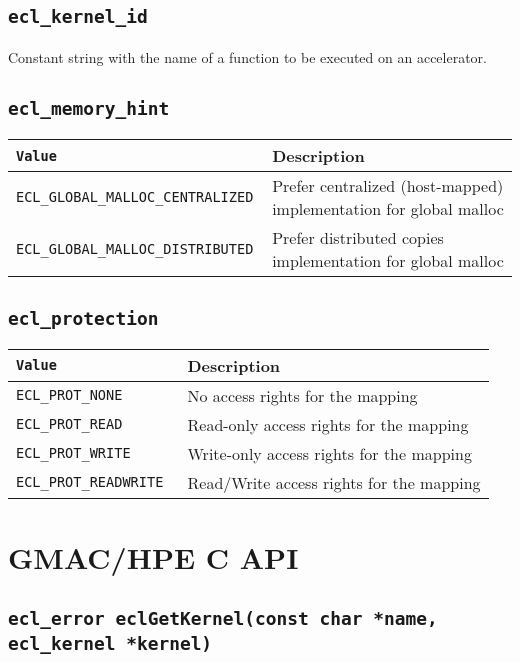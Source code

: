 \subsection{\texttt{ecl\_kernel\_id}}

Constant string with the name of a function to be executed on an accelerator.

\subsection{\texttt{ecl\_memory\_hint}}
\begin{tabularx}{\linewidth}{|>{\texttt\bgroup}l<{\egroup}|X|}
  \hline
  \textnormal{Value} & Description \\
  \hline
  \hline
  ECL\_GLOBAL\_MALLOC\_CENTRALIZED & Prefer centralized (host\hyp{}mapped) implementation for global 
  malloc \\
  ECL\_GLOBAL\_MALLOC\_DISTRIBUTED & Prefer distributed copies implementation for global malloc \\
  \hline
\end{tabularx}


\subsection{\texttt{ecl\_protection}}
\begin{tabularx}{\linewidth}{|>{\texttt\bgroup}l<{\egroup}|X|}
  \hline
  \textnormal{Value} & Description \\
  \hline
  \hline
  ECL\_PROT\_NONE  & No access rights for the mapping \\
  ECL\_PROT\_READ  & Read\hyp{}only access rights for the mapping \\
  ECL\_PROT\_WRITE & Write\hyp{}only access rights for the mapping \\
  ECL\_PROT\_READWRITE & Read\slash{}Write access rights for the mapping \\
  \hline
\end{tabularx}

\section{GMAC\slash HPE C API}

\subsection{\texttt{ecl\_error eclGetKernel(const char *name, ecl\_kernel *kernel)}}

